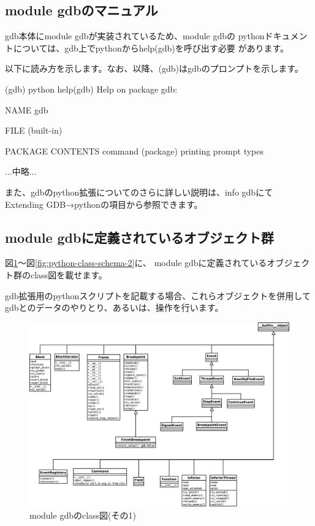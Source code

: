 \documentclass[mingoth,a4paper]{jsarticle}
\begin{document}
\subsection{module gdbのマニュアル}

 gdb本体にmodule gdbが実装されているため、module gdbの
pythonドキュメントについては、gdb上でpythonからhelp(gdb)を呼び出す必要
があります。

 以下に読み方を示します。なお、以降、(gdb)はgdbのプロンプトを示します。

\begin{commandline}
(gdb) python help(gdb)
Help on package gdb:

NAME
    gdb

FILE
    (built-in)

PACKAGE CONTENTS
    command (package)
    printing
    prompt
    types

...中略...
\end{commandline}

 また、gdbのpython拡張についてのさらに詳しい説明は、info gdbにて
Extending GDB→pythonの項目から参照できます。

\subsection{module gdbに定義されているオブジェクト群}

 図\ref{fig:python-class-schema-1}〜図\ref{fig:python-class-schema-2}に、
module gdbに定義されているオブジェクト群のclass図を載せます。

 gdb拡張用のpythonスクリプトを記載する場合、これらオブジェクトを併用して
gdbとのデータのやりとり、あるいは、操作を行います。

\begin{figure}[h]
\begin{center}
 \includegraphics[width=0.8\hsize]{image201301/gdb-python/gdb-python-class-schema-1.eps}
 \caption{module gdbのclass図(その1)}
 \label{fig:python-class-schema-1}
\end{center}
\end{figure}
\end{document}
